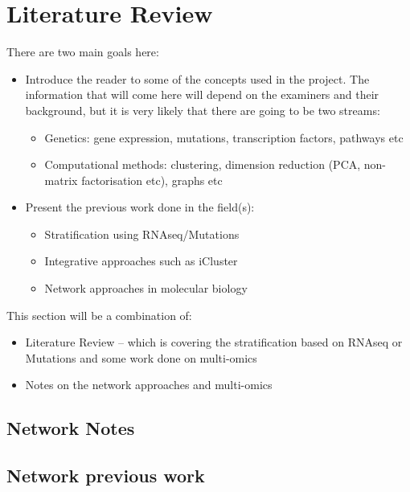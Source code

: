\section{Literature Review}

There are two main goals here:
\begin{itemize}
    \item Introduce the reader to some of the concepts used in the project. The information that will come here will depend on the examiners and their background, but it is very likely that there are going to be two streams:
    \begin{itemize}
        \item Genetics: gene expression, mutations, transcription factors, pathways etc
        \item Computational methods: clustering, dimension reduction (PCA, non-matrix factorisation etc), graphs etc 
    \end{itemize}
    \item Present the previous work done in the field(s):
    \begin{itemize}
        \item Stratification using RNAseq/Mutations
        \item Integrative approaches such as iCluster
        \item Network approaches in molecular biology  
    \end{itemize}
\end{itemize}

This section will be a combination of:
\begin{itemize}
    \item Literature Review -- which is covering the stratification based on RNAseq or Mutations and some work done on multi-omics
    \item Notes on the network approaches and multi-omics
\end{itemize}


\subsection{Network Notes}

\subsection{Network previous work}

